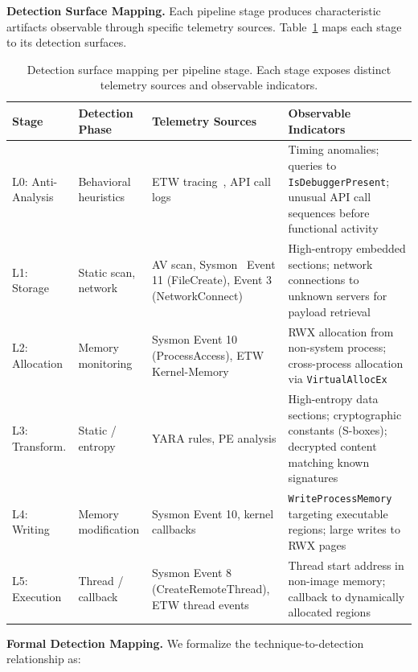 \documentclass[10pt,a4paper,twocolumn]{article}
\begin{document}
\textbf{Detection Surface Mapping.}
Each pipeline stage produces characteristic artifacts observable through specific telemetry sources.
Table~\ref{tab:detection_surface} maps each stage to its detection surfaces.

\begin{table}[htbp]
    \centering
    \caption{Detection surface mapping per pipeline stage. Each stage exposes distinct telemetry sources and observable indicators.}
    \label{tab:detection_surface}
    \small
    \begin{tabular}{@{}p{1.8cm}p{3.0cm}p{4.5cm}p{5.7cm}@{}}
        \toprule
        \textbf{Stage} & \textbf{Detection Phase} & \textbf{Telemetry Sources} & \textbf{Observable Indicators} \\
        \midrule
        L0: Anti-Analysis &
        Behavioral heuristics &
        ETW tracing~\cite{etw}, API call logs &
        Timing anomalies; queries to \texttt{IsDebuggerPresent}; unusual API call sequences before functional activity \\
        \midrule
        L1: Storage &
        Static scan, network &
        AV scan, Sysmon~\cite{sysmon} Event 11 (FileCreate), Event 3 (NetworkConnect) &
        High-entropy embedded sections; network connections to unknown servers for payload retrieval \\
        \midrule
        L2: Allocation &
        Memory monitoring &
        Sysmon Event 10 (ProcessAccess), ETW Kernel-Memory &
        RWX allocation from non-system process; cross-process allocation via \texttt{VirtualAllocEx} \\
        \midrule
        L3: Transform. &
        Static / entropy &
        YARA rules, PE analysis &
        High-entropy data sections; cryptographic constants (S-boxes); decrypted content matching known signatures \\
        \midrule
        L4: Writing &
        Memory modification &
        Sysmon Event 10, kernel callbacks &
        \texttt{WriteProcessMemory} targeting executable regions; large writes to RWX pages \\
        \midrule
        L5: Execution &
        Thread / callback &
        Sysmon Event 8 (CreateRemoteThread), ETW thread events &
        Thread start address in non-image memory; callback to dynamically allocated regions \\
        \bottomrule
    \end{tabular}
\end{table}

\textbf{Formal Detection Mapping.}
We formalize the technique-to-detection relationship as:
\end{document}
